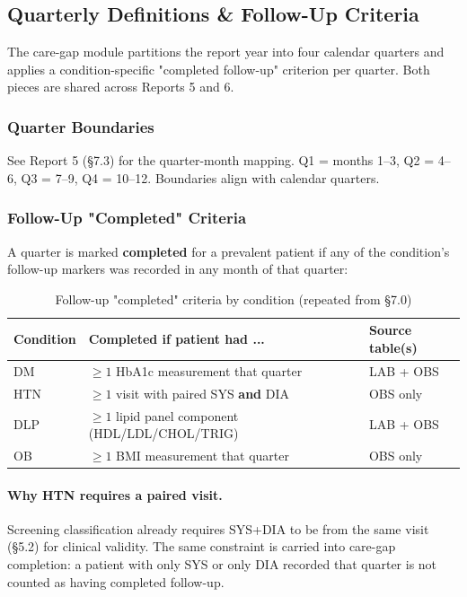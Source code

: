 \documentclass[11pt,a4paper]{article}
\begin{document}
\subsection{Quarterly Definitions \& Follow-Up Criteria}

The care-gap module partitions the report year into four calendar quarters and applies a condition-specific "completed follow-up" criterion per quarter. Both pieces are shared across Reports 5 and 6.

\subsubsection{Quarter Boundaries}

See Report 5 (§7.3) for the quarter-month mapping. Q1 = months 1--3, Q2 = 4--6, Q3 = 7--9, Q4 = 10--12. Boundaries align with calendar quarters.

\subsubsection{Follow-Up "Completed" Criteria}

A quarter is marked \textbf{completed} for a prevalent patient if any of the condition's follow-up markers was recorded in any month of that quarter:

\begin{table}[ht]
\centering
\caption{Follow-up "completed" criteria by condition (repeated from §7.0)}
\begin{tabular}{@{}lll@{}}
\toprule
\textbf{Condition} & \textbf{Completed if patient had ...} & \textbf{Source table(s)} \\
\midrule
DM  & $\geq 1$ HbA1c measurement that quarter              & LAB + OBS \\
HTN & $\geq 1$ visit with paired SYS \textbf{and} DIA      & OBS only \\
DLP & $\geq 1$ lipid panel component (HDL/LDL/CHOL/TRIG)   & LAB + OBS \\
OB  & $\geq 1$ BMI measurement that quarter                 & OBS only \\
\bottomrule
\end{tabular}
\end{table}

\paragraph{Why HTN requires a paired visit.}
Screening classification already requires SYS+DIA to be from the same visit (§5.2) for clinical validity. The same constraint is carried into care-gap completion: a patient with only SYS or only DIA recorded that quarter is not counted as having completed follow-up.
\end{document}

